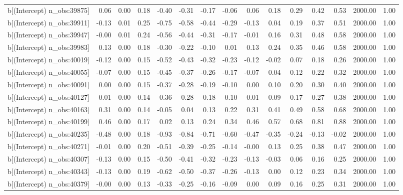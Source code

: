 \begin{table}[ht]
\begin{tabular}{rrrrrrrrrrrrrrr}
  b[(Intercept) n\_obs:39875] & 0.06 & 0.00 & 0.18 & -0.40 & -0.31 & -0.17 & -0.06 & 0.06 & 0.18 & 0.29 & 0.42 & 0.53 & 2000.00 & 1.00 \\ 
  b[(Intercept) n\_obs:39911] & -0.13 & 0.01 & 0.25 & -0.75 & -0.58 & -0.44 & -0.29 & -0.13 & 0.04 & 0.19 & 0.37 & 0.51 & 2000.00 & 1.00 \\ 
  b[(Intercept) n\_obs:39947] & -0.00 & 0.01 & 0.24 & -0.56 & -0.44 & -0.31 & -0.17 & -0.01 & 0.16 & 0.31 & 0.48 & 0.58 & 2000.00 & 1.00 \\ 
  b[(Intercept) n\_obs:39983] & 0.13 & 0.00 & 0.18 & -0.30 & -0.22 & -0.10 & 0.01 & 0.13 & 0.24 & 0.35 & 0.46 & 0.58 & 2000.00 & 1.00 \\ 
  b[(Intercept) n\_obs:40019] & -0.12 & 0.00 & 0.15 & -0.52 & -0.43 & -0.32 & -0.23 & -0.12 & -0.02 & 0.07 & 0.18 & 0.26 & 2000.00 & 1.00 \\ 
  b[(Intercept) n\_obs:40055] & -0.07 & 0.00 & 0.15 & -0.45 & -0.37 & -0.26 & -0.17 & -0.07 & 0.04 & 0.12 & 0.22 & 0.32 & 2000.00 & 1.00 \\ 
  b[(Intercept) n\_obs:40091] & 0.00 & 0.00 & 0.15 & -0.37 & -0.28 & -0.19 & -0.10 & 0.00 & 0.10 & 0.20 & 0.30 & 0.40 & 2000.00 & 1.00 \\ 
  b[(Intercept) n\_obs:40127] & -0.01 & 0.00 & 0.14 & -0.36 & -0.28 & -0.18 & -0.10 & -0.01 & 0.09 & 0.17 & 0.27 & 0.38 & 2000.00 & 1.00 \\ 
  b[(Intercept) n\_obs:40163] & 0.31 & 0.00 & 0.14 & -0.05 & 0.04 & 0.13 & 0.22 & 0.31 & 0.41 & 0.49 & 0.58 & 0.68 & 2000.00 & 1.00 \\ 
  b[(Intercept) n\_obs:40199] & 0.46 & 0.00 & 0.17 & 0.02 & 0.13 & 0.24 & 0.34 & 0.46 & 0.57 & 0.68 & 0.81 & 0.88 & 2000.00 & 1.00 \\ 
  b[(Intercept) n\_obs:40235] & -0.48 & 0.00 & 0.18 & -0.93 & -0.84 & -0.71 & -0.60 & -0.47 & -0.35 & -0.24 & -0.13 & -0.02 & 2000.00 & 1.00 \\ 
  b[(Intercept) n\_obs:40271] & -0.01 & 0.00 & 0.20 & -0.51 & -0.39 & -0.25 & -0.14 & -0.00 & 0.13 & 0.25 & 0.38 & 0.47 & 2000.00 & 1.00 \\ 
  b[(Intercept) n\_obs:40307] & -0.13 & 0.00 & 0.15 & -0.50 & -0.41 & -0.32 & -0.23 & -0.13 & -0.03 & 0.06 & 0.16 & 0.25 & 2000.00 & 1.00 \\ 
  b[(Intercept) n\_obs:40343] & -0.13 & 0.00 & 0.19 & -0.62 & -0.50 & -0.37 & -0.26 & -0.13 & 0.00 & 0.12 & 0.23 & 0.34 & 2000.00 & 1.00 \\ 
  b[(Intercept) n\_obs:40379] & -0.00 & 0.00 & 0.13 & -0.33 & -0.25 & -0.16 & -0.09 & 0.00 & 0.09 & 0.16 & 0.25 & 0.31 & 2000.00 & 1.00 \\ 

\end{tabular}
\end{table}
